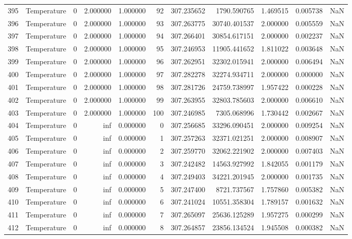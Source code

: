 \begin{tabular}{llrrrrrrrrr}
395 & Temperature & 0 & 2.000000 & 1.000000 & 92 & 307.235652 & 1790.590765 & 1.469515 & 0.005738 & NaN \\
396 & Temperature & 0 & 2.000000 & 1.000000 & 93 & 307.263775 & 30740.401537 & 2.000000 & 0.005559 & NaN \\
397 & Temperature & 0 & 2.000000 & 1.000000 & 94 & 307.266401 & 30854.617151 & 2.000000 & 0.002237 & NaN \\
398 & Temperature & 0 & 2.000000 & 1.000000 & 95 & 307.246953 & 11905.441652 & 1.811022 & 0.003648 & NaN \\
399 & Temperature & 0 & 2.000000 & 1.000000 & 96 & 307.262951 & 32302.015941 & 2.000000 & 0.006494 & NaN \\
400 & Temperature & 0 & 2.000000 & 1.000000 & 97 & 307.282278 & 32274.934711 & 2.000000 & 0.000000 & NaN \\
401 & Temperature & 0 & 2.000000 & 1.000000 & 98 & 307.281726 & 24759.738997 & 1.957422 & 0.000228 & NaN \\
402 & Temperature & 0 & 2.000000 & 1.000000 & 99 & 307.263955 & 32803.785603 & 2.000000 & 0.006610 & NaN \\
403 & Temperature & 0 & 2.000000 & 1.000000 & 100 & 307.246985 & 7305.068996 & 1.730442 & 0.002667 & NaN \\
404 & Temperature & 0 & inf & 0.000000 & 0 & 307.256685 & 33296.090451 & 2.000000 & 0.009254 & NaN \\
405 & Temperature & 0 & inf & 0.000000 & 1 & 307.257263 & 32371.021251 & 2.000000 & 0.008907 & NaN \\
406 & Temperature & 0 & inf & 0.000000 & 2 & 307.259770 & 32062.221902 & 2.000000 & 0.007403 & NaN \\
407 & Temperature & 0 & inf & 0.000000 & 3 & 307.242482 & 14563.927992 & 1.842055 & 0.001179 & NaN \\
408 & Temperature & 0 & inf & 0.000000 & 4 & 307.249403 & 34221.201945 & 2.000000 & 0.001735 & NaN \\
409 & Temperature & 0 & inf & 0.000000 & 5 & 307.247400 & 8721.737567 & 1.757860 & 0.005382 & NaN \\
410 & Temperature & 0 & inf & 0.000000 & 6 & 307.241024 & 10551.358304 & 1.789157 & 0.001632 & NaN \\
411 & Temperature & 0 & inf & 0.000000 & 7 & 307.265097 & 25636.125289 & 1.957275 & 0.000299 & NaN \\
412 & Temperature & 0 & inf & 0.000000 & 8 & 307.264857 & 23856.134524 & 1.945508 & 0.000382 & NaN \\

\end{tabular}
